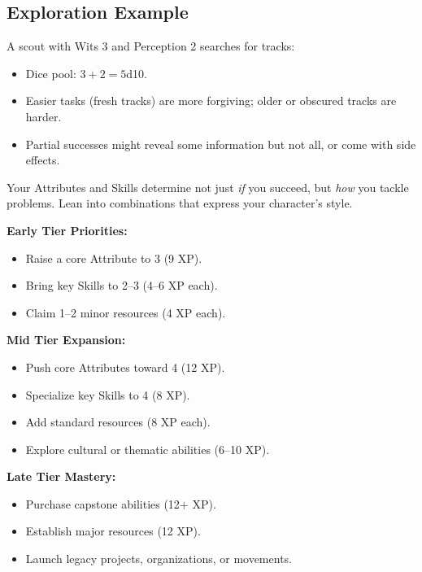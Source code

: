 \subsection{Exploration Example}
\label{sec:exploration-example}
A scout with Wits 3 and Perception 2 searches for tracks:
\begin{itemize}
  \item Dice pool: $3 + 2 = 5$d10.
  \item Easier tasks (fresh tracks) are more forgiving; older or obscured tracks are harder.
  \item Partial successes might reveal some information but not all, or come with side effects.
\end{itemize}

\noindent Your Attributes and Skills determine not just \emph{if} you succeed, but
\emph{how} you tackle problems. Lean into combinations that express your
character's style.

\begin{tcolorbox}[colback=green!5!white,colframe=green!75!black,title=XP Planning Guide,fonttitle=\bfseries]
\textbf{Early Tier Priorities:}
\begin{itemize}
  \item Raise a core Attribute to 3 (9 XP).
  \item Bring key Skills to 2–3 (4–6 XP each).
  \item Claim 1–2 minor resources (4 XP each).
\end{itemize}

\textbf{Mid Tier Expansion:}
\begin{itemize}
  \item Push core Attributes toward 4 (12 XP).
  \item Specialize key Skills to 4 (8 XP).
  \item Add standard resources (8 XP each).
  \item Explore cultural or thematic abilities (6–10 XP).
\end{itemize}

\textbf{Late Tier Mastery:}
\begin{itemize}
  \item Purchase capstone abilities (12+ XP).
  \item Establish major resources (12 XP).
  \item Launch legacy projects, organizations, or movements.
\end{itemize}
\end{tcolorbox}

